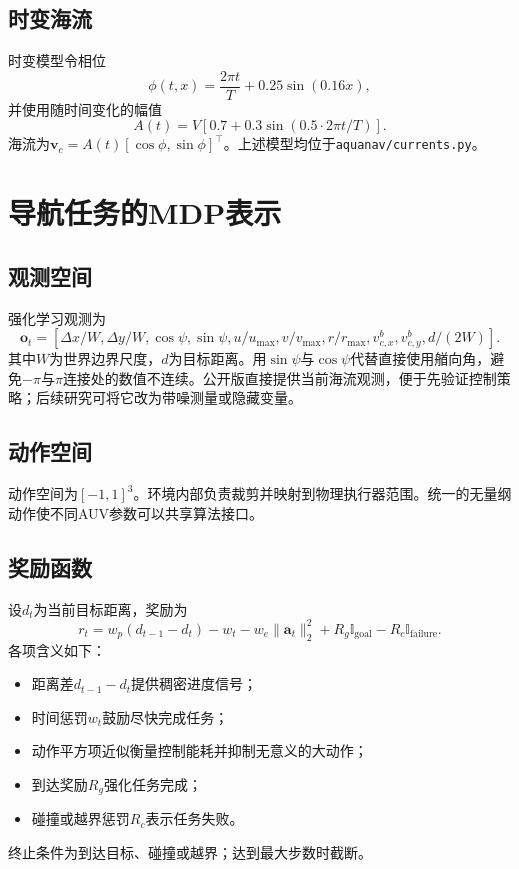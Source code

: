 \documentclass[11pt,a4paper]{ctexart}
\begin{document}
\subsection{时变海流}
时变模型令相位
\begin{equation}
\phi(t,x)=\frac{2\pi t}{T}+0.25\sin(0.16x),
\end{equation}
并使用随时间变化的幅值
\begin{equation}
A(t)=V[0.7+0.3\sin(0.5\cdot2\pi t/T)].
\end{equation}
海流为$\bm v_c=A(t)[\cos\phi,\sin\phi]^\top$。上述模型均位于\texttt{aquanav/currents.py}。

\section{导航任务的MDP表示}

\subsection{观测空间}

强化学习观测为
\begin{equation}
\bm o_t=[\Delta x/W,\Delta y/W,\cos\psi,\sin\psi,
u/u_{\max},v/v_{\max},r/r_{\max},
v_{c,x}^b,v_{c,y}^b,d/(2W)].
\end{equation}
其中$W$为世界边界尺度，$d$为目标距离。用$\sin\psi$与$\cos\psi$代替直接使用艏向角，避免$-\pi$与$\pi$连接处的数值不连续。公开版直接提供当前海流观测，便于先验证控制策略；后续研究可将它改为带噪测量或隐藏变量。

\subsection{动作空间}

动作空间为$[-1,1]^3$。环境内部负责裁剪并映射到物理执行器范围。统一的无量纲动作使不同AUV参数可以共享算法接口。

\subsection{奖励函数}

设$d_t$为当前目标距离，奖励为
\begin{equation}
r_t=w_p(d_{t-1}-d_t)-w_t-w_e\|\bm a_t\|_2^2
+R_g\mathbb I_{\mathrm{goal}}-R_c\mathbb I_{\mathrm{failure}}.
\end{equation}
各项含义如下：
\begin{itemize}
  \item 距离差$d_{t-1}-d_t$提供稠密进度信号；
  \item 时间惩罚$w_t$鼓励尽快完成任务；
  \item 动作平方项近似衡量控制能耗并抑制无意义的大动作；
  \item 到达奖励$R_g$强化任务完成；
  \item 碰撞或越界惩罚$R_c$表示任务失败。
\end{itemize}
终止条件为到达目标、碰撞或越界；达到最大步数时截断。
\end{document}
